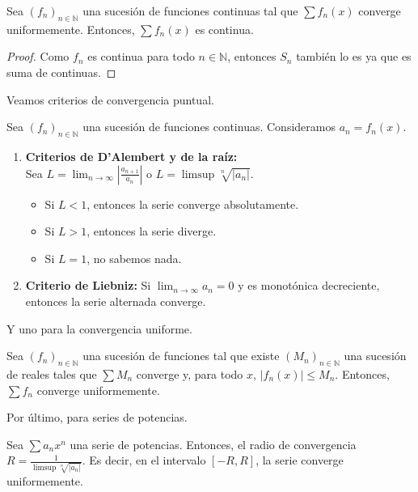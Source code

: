 \begin{proposition}
	Sea $(f_n)_{n \in \mathbb{N}}$ una sucesión de funciones continuas tal que $\sum f_n(x)$ converge uniformemente. Entonces, $\sum f_n(x)$ es continua.
\end{proposition}

\begin{proof}
	Como $f_n$ es continua para todo $n \in \mathbb{N}$, entonces $S_n$ también lo es ya que es suma de continuas.
\end{proof}

Veamos criterios de convergencia puntual.

\begin{proposition}
	Sea $(f_n)_{n \in \mathbb{N}}$ una sucesión de funciones continuas. Consideramos $a_n = f_n(x)$.
	\begin{enumerate}
		\item \textbf{Criterios de D'Alembert y de la raíz:} \\Sea $L = \lim_{n \to \infty} \left\lvert \frac{a_{n+1}}{a_n} \right\rvert$ o $L = \limsup \sqrt[n]{\left\lvert a_n \right\rvert}$.
		      \begin{itemize}
			      \item Si $L < 1$, entonces la serie converge absolutamente.
			      \item Si $L > 1$, entonces la serie diverge.
			      \item Si $L = 1$, no sabemos nada.
		      \end{itemize}

		\item \textbf{Criterio de Liebniz:} Si $\lim_{n \to \infty} a_n = 0$ y es monotónica decreciente, entonces la serie alternada converge.
	\end{enumerate}
\end{proposition}


Y uno para la convergencia uniforme.

\begin{proposition}
	Sea $(f_n)_{n \in \mathbb{N}}$ una sucesión de funciones tal que existe $(M_n)_{n \in \mathbb{N}}$ una sucesión de reales tales que $\sum M_n$ converge y, para todo $x$, $\left\lvert f_n(x) \right\rvert \leq M_n$. Entonces, $\sum f_n$ converge uniformemente.
\end{proposition}

Por último, para series de potencias.

\begin{proposition}
	Sea $\sum a_n x^n$ una serie de potencias. Entonces, el radio de convergencia $R = \frac{1}{\limsup \sqrt[n]{\left\lvert a_n \right\rvert}}$. Es decir, en el intervalo $[-R, R]$, la serie converge uniformemente.
\end{proposition}

